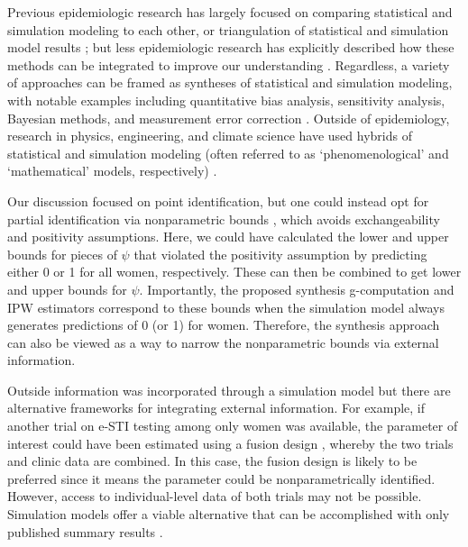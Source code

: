 \documentclass[]{article}
\begin{document}
Previous epidemiologic research has largely focused on comparing statistical and simulation modeling to each other, or triangulation of statistical and simulation model results \cite{murray_comparison_2017, mooney_g-computation_2021, murray_emulating_2021, ip_reconciling_2013, hernan_invited_2015, buchanan_disseminated_2021, el-sayed_social_2012, lofgren_re_2017, ackley_dynamical_2022, halloran_simulations_2017, keyes_invited_2017, edwards_invited_2017, lofgren_mathematical_2014, arnold_dag_2019, ackley_compartmental_2017, mooney_g-computation_2022}; but less epidemiologic research has explicitly described how these methods can be integrated to improve our understanding \cite{cerda_systems_2019}. Regardless, a variety of approaches can be framed as syntheses of statistical and simulation modeling, with notable examples including quantitative bias analysis, sensitivity analysis, Bayesian methods, and measurement error correction \cite{greenland_bayesian_2009, greenland_interval_2004, robins_sensitivity_2000, shepherd_does_2008}. Outside of epidemiology, research in physics, engineering, and climate science have used hybrids of statistical and simulation modeling (often referred to as `phenomenological' and `mathematical' models, respectively) \cite{rahmstorf_semi-empirical_2007, wright_semi-empirical_nodate, sausen_efficiency_2018, rezaei_hybrid_2020}.

Our discussion focused on point identification, but one could instead opt for partial identification via nonparametric bounds \cite{manski_nonparametric_1990, cole_nonparametric_2019}, which avoids exchangeability and positivity assumptions. Here, we could have calculated the lower and upper bounds for pieces of $\psi$ that violated the positivity assumption by predicting either 0 or 1 for all women, respectively. These can then be combined to get lower and upper bounds for $\psi$. Importantly, the proposed synthesis g-computation and IPW estimators correspond to these bounds when the simulation model always generates predictions of 0 (or 1) for women. Therefore, the synthesis approach can also be viewed as a way to narrow the nonparametric bounds via external information.

Outside information was incorporated through a simulation model but there are alternative frameworks for integrating external information. For example, if another trial on e-STI testing among only women was available, the parameter of interest could have been estimated using a fusion design \cite{cole_illustration_2022}, whereby the two trials and clinic data are combined. In this case, the fusion design is likely to be preferred since it means the parameter could be nonparametrically identified. However, access to individual-level data of both trials may not be possible. Simulation models offer a viable alternative that can be accomplished with only published summary results \cite{lofgren_estimated_2021}. 
\end{document}

